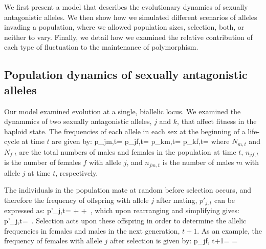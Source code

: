 \documentclass[12pt]{article}
\let\oldequation\equation
\let\oldendequation\endequation
\renewenvironment{equation}
  {\linenomathNonumbers\oldequation}
  {\oldendequation\endlinenomath}
\begin{document}
We first present  a model that describes the evolutionary dynamics of sexually antagonistic alleles. We then show how we simulated different scenarios of alleles invading a population, where we allowed population sizes, selection, both, or neither to vary. Finally, we detail how we examined the relative contribution of each type of fluctuation to the maintenance of polymorphism.

\subsection*{Population dynamics of sexually antagonistic alleles}

 Our model examined evolution at a single, biallelic locus.  We examined the dynammics of two  sexually antagonistic alleles, $j$ and $k$, that affect fitness in the haploid state. The frequencies of each allele in each sex at the beginning of a life-cycle at time $t$ are given by:
 \begin{equation}
     p_{jm,t}= 
     \label{first_pop}
 \end{equation}
 \begin{equation}
     p_{jf,t}= 
 \end{equation}
 \begin{equation}
     p_{km,t}= 
 \end{equation}
 \begin{equation}
     p_{kf,t}= 
 \end{equation}
 where $N_{m,t}$ and $N_{f,t}$ are the total numbers of males and females in the population at time $t$, $n_{jf,t}$ is the number of females $f$ with allele $j$, and $n_{jm,t}$ is the number of males $m$ with allele $j$ at time $t$, respectively.

 The individuals in the population mate at random before selection occurs, and therefore the frequency of offspring with allele $j$ after mating, $p'_{j,t}$ can be expressed as:
 \begin{equation}
    p'_{j,t}=   +    +
      \,,
 \end{equation}
which upon rearranging and simplifying gives:
 \begin{equation}
    p'_{j,t}=  \,.
    \label{pprime}
 \end{equation}
 Selection acts upon these offspring in order to determine the allelic frequencies in females and males in the next generation, $t+1$. As an example, the frequency  of females with allele $j$ after selection is given by:
 \begin{equation}
    p_{jf, t+1}=  = 
    \label{next_gen}
 \end{equation}
\end{document}
